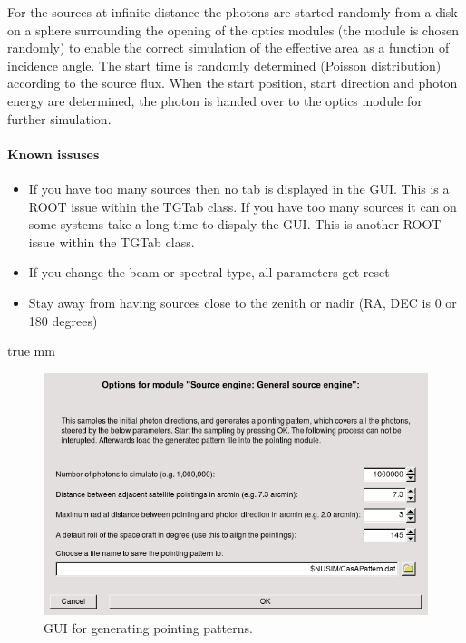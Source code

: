 For the sources at infinite distance the photons are started randomly from a disk on a sphere surrounding the opening of the optics modules (the module is chosen randomly) to enable the correct simulation of the effective area as a function of incidence angle. The start time is randomly determined (Poisson distribution) according to the source flux. When the start position, start direction and photon energy are determined, the photon is handed over to the optics module for further simulation.


\paragraph{Known issuses} 

\begin{itemize}
\item If you have too many sources then no tab is displayed in the GUI. This is a ROOT issue within the TGTab class. If you have too many sources it can on some systems take a long time to dispaly the GUI. This is another ROOT issue within the TGTab class.
\item If you change the beam or spectral type, all parameters get reset
\item Stay away from having sources close to the zenith or nadir (RA, DEC is 0 or 180 degrees) 
\end{itemize}

 true mm

\begin{figure}[tb]
\begin{center}
\includegraphics[scale=0.5]{images/pointingpatternGUI.png}  
\caption{GUI for generating pointing patterns.}
\label{pointingpatterngui} 
\end{center}
\end{figure}

